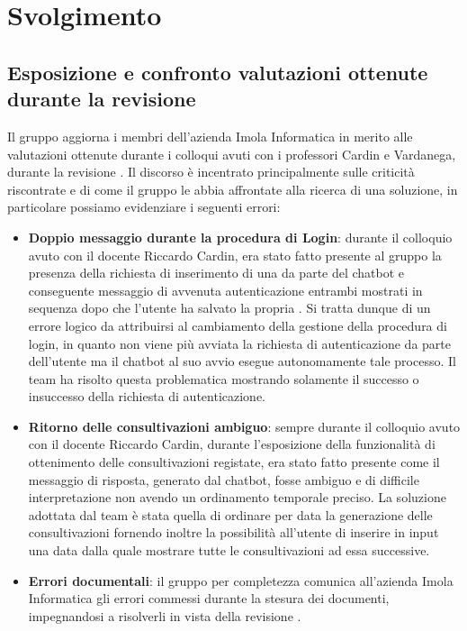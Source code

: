 \section{Svolgimento}
\subsection{Esposizione e confronto valutazioni ottenute durante la revisione }
Il gruppo aggiorna i membri dell'azienda Imola Informatica in merito alle valutazioni ottenute durante i colloqui avuti con i professori Cardin e Vardanega, durante la revisione . Il discorso è incentrato principalmente sulle criticità riscontrate e di come il gruppo le abbia affrontate alla ricerca di una soluzione, in particolare possiamo evidenziare i seguenti errori: 
\begin{itemize}
    \item \textbf{Doppio messaggio durante la procedura di Login}: durante il colloquio avuto con il docente Riccardo Cardin, era stato fatto presente al gruppo la presenza della richiesta di inserimento di una  da parte del chatbot e conseguente messaggio di avvenuta autenticazione entrambi mostrati in sequenza dopo che l'utente ha salvato la propria . Si tratta dunque di un errore logico da attribuirsi al cambiamento della gestione della procedura di login, in quanto non viene più avviata la richiesta di autenticazione da parte dell'utente ma il chatbot al suo avvio esegue autonomamente tale processo. Il team ha risolto questa problematica mostrando solamente il successo o insuccesso della richiesta di autenticazione.
    \item \textbf{Ritorno delle consultivazioni ambiguo}: sempre durante il colloquio avuto con il docente Riccardo Cardin, durante l'esposizione della funzionalità di ottenimento delle consultivazioni registate, era stato fatto presente come il messaggio di risposta, generato dal chatbot, fosse ambiguo e di difficile interpretazione non avendo un ordinamento temporale preciso. La soluzione adottata dal team è stata quella di ordinare per data la generazione delle consultivazioni fornendo inoltre la possibilità all'utente di inserire in input una data dalla quale mostrare tutte le consultivazioni ad essa successive. 
    \item \textbf{Errori documentali}: il gruppo per completezza comunica all'azienda Imola Informatica gli errori commessi durante la stesura dei documenti, impegnandosi a risolverli in vista della revisione .
\end{itemize}

